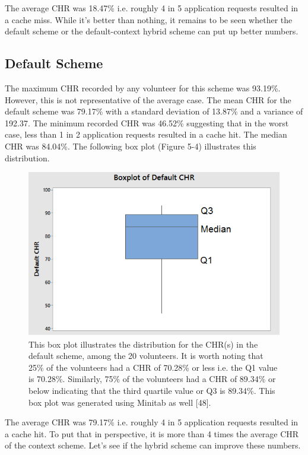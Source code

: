 \documentclass[12pt]{uthesis-v12}  %
\begin{document}
				The average CHR was 18.47\% i.e. roughly 4 in 5 application requests resulted in a cache miss. While it's better than nothing, it remains to be seen whether the default scheme or the default-context hybrid scheme can put up better numbers.	
			
			\subsection{Default Scheme}
				The maximum CHR recorded by any volunteer for this scheme was 93.19\%. However, this is not representative of the average case. The mean CHR for the default scheme was 79.17\% with a standard deviation of 13.87\% and a variance of 192.37. The minimum recorded CHR was 46.52\% suggesting that in the worst case, less than 1 in 2 application requests resulted in a cache hit. The median CHR was 84.04\%. The following box plot (Figure 5-4) illustrates this distribution.
				
				\begin{figure}[h]
					\centering
					\includegraphics[width = 130mm]{images/defaultScheme.png}
					\caption[Distribution of CHR for Default Scheme]{This box plot illustrates the distribution for the CHR(s) in the default scheme, among the 20 volunteers. It is worth noting that 25\% of the volunteers had a CHR of 70.28\% or less i.e. the Q1 value is 70.28\%. Similarly, 75\% of the volunteers had a CHR of 89.34\% or below indicating that the third quartile value or Q3 is 89.34\%. This box plot was generated using Minitab as well [48].}
				\end{figure}
				
				The average CHR was 79.17\% i.e. roughly 4 in 5 application requests resulted in a cache hit. To put that in perspective, it is more than 4 times the average CHR of the context scheme. Let's see if the hybrid scheme can improve these numbers.
				
\end{document}
